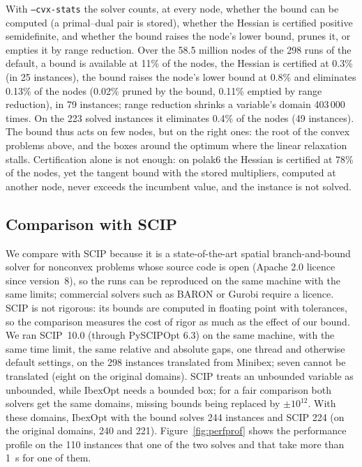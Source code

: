 \documentclass[11pt]{article}
\begin{document}
With \texttt{--cvx-stats} the solver counts, at every node, whether the bound can be
computed (a primal--dual pair is stored), whether the Hessian is certified positive
semidefinite, and whether the bound raises the node's lower bound, prunes it, or
empties it by range reduction. Over the 58.5 million nodes of the 298 runs of the
default, a bound is available at 11\% of the nodes, the Hessian is certified at 0.3\%
(in 25 instances), the bound raises the node's lower bound at 0.8\% and eliminates
0.13\% of the nodes (0.02\% pruned by the bound, 0.11\% emptied by range reduction), in
79 instances; range reduction shrinks a variable's domain 403\,000 times. On the 223
solved instances it eliminates 0.4\% of the nodes (49 instances). The bound thus acts on few nodes, but on the right
ones: the root of the convex problems above, and the boxes around the optimum where
the linear relaxation stalls. Certification alone is not enough: on polak6 the Hessian
is certified at 78\% of the nodes, yet the tangent bound with the stored multipliers,
computed at another node, never exceeds the incumbent value, and the instance is not
solved.

\subsection{Comparison with SCIP}

We compare with SCIP \citep{VigerskeGleixner2018} because it is a state-of-the-art
spatial branch-and-bound solver for nonconvex problems whose source code is open (Apache
2.0 licence since version~8), so the runs can be reproduced on the same machine with
the same limits; commercial solvers such as BARON or Gurobi require a licence. SCIP is
not rigorous: its bounds are computed in floating point with tolerances, so the
comparison measures the cost of rigor as much as the effect of our bound. We ran
SCIP~10.0 (through PySCIPOpt 6.3) on the same machine, with the same time
limit, the same relative and absolute gaps, one thread and otherwise default settings,
on the 298 instances translated from Minibex; seven cannot be translated (eight on the
original domains). SCIP treats an unbounded variable as unbounded,
while IbexOpt needs a bounded box; for a fair comparison both solvers get the same
domains, missing bounds being replaced by $\pm 10^{12}$. With these domains, IbexOpt
with the bound solves 244 instances and SCIP 224 (on the original domains, 240 and 221).
Figure~\ref{fig:perfprof} shows the performance profile on the 110 instances that one
of the two solves and that take more than 1~s for one of them.
\end{document}
